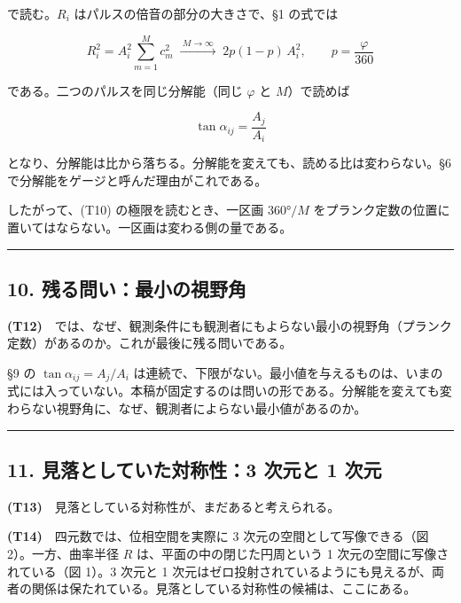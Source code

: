 \documentclass[
  a4paper,
]{ltjsarticle}
\begin{document}
で読む。\(R_i\) はパルスの倍音の部分の大きさで、§1 の式では

\[
R_i^{2}=A_i^{2}\sum_{m=1}^{M}c_m^{2}\;\xrightarrow{\;M\to\infty\;}\;2p(1-p)\,A_i^{2},\qquad p=\frac{\varphi}{360}
\]

である。二つのパルスを同じ分解能（同じ \(\varphi\) と \(M\)）で読めば

\[
\tan\alpha_{ij}=\frac{A_j}{A_i}
\]

となり、分解能は比から落ちる。分解能を変えても、読める比は変わらない。§6
で分解能をゲージと呼んだ理由がこれである。

したがって、(T10) の極限を読むとき、一区画 \(360°/M\)
をプランク定数の位置に置いてはならない。一区画は変わる側の量である。

\begin{center}\rule{0.5\linewidth}{0.5pt}\end{center}

\subsection{10.
残る問い：最小の視野角}\label{ux6b8bux308bux554fux3044ux6700ux5c0fux306eux8996ux91ceux89d2}

\textbf{(T12)}　では、なぜ、観測条件にも観測者にもよらない最小の視野角（プランク定数）があるのか。これが最後に残る問いである。

§9 の \(\tan\alpha_{ij}=A_j/A_i\)
は連続で、下限がない。最小値を与えるものは、いまの式には入っていない。本稿が固定するのは問いの形である。分解能を変えても変わらない視野角に、なぜ、観測者によらない最小値があるのか。

\begin{center}\rule{0.5\linewidth}{0.5pt}\end{center}

\subsection{11. 見落としていた対称性：3 次元と 1
次元}\label{ux898bux843dux3068ux3057ux3066ux3044ux305fux5bfeux79f0ux60273-ux6b21ux5143ux3068-1-ux6b21ux5143}

\textbf{(T13)}　見落としている対称性が、まだあると考えられる。

\textbf{(T14)}　四元数では、位相空間を実際に 3
次元の空間として写像できる（図 2）。一方、曲率半径 \(R\)
は、平面の中の閉じた円周という 1 次元の空間に写像されている（図 1）。3
次元と 1
次元はゼロ投射されているようにも見えるが、両者の関係は保たれている。見落としている対称性の候補は、ここにある。
\end{document}
